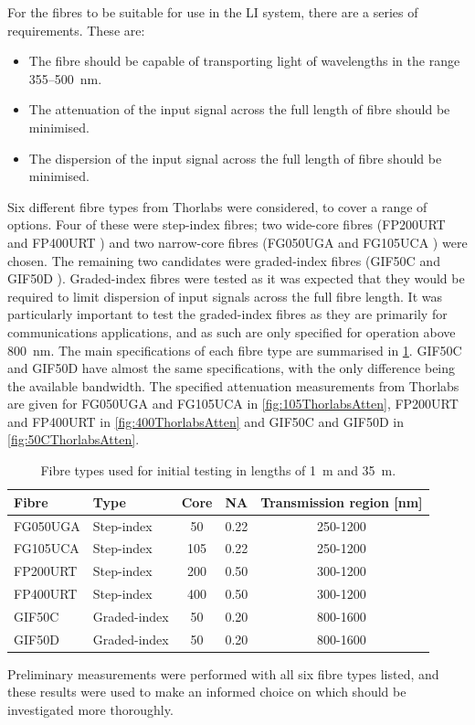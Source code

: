 \documentclass[a4paper,11pt]{article}
\begin{document}
For the fibres to be suitable for use in the LI system, there are a series of requirements. These are:
\begin{itemize}
\item The fibre should be capable of transporting light of wavelengths in the range 355--500~nm.
\item The attenuation of the input signal across the full length of fibre should be minimised.
\item The dispersion of the input signal across the full length of fibre should be minimised.
\end{itemize}

Six different fibre types from Thorlabs were considered, to cover a range of options. Four of these were step-index fibres; two wide-core fibres (FP200URT \cite{bib:fp200urt} and FP400URT \cite{bib:fp400urt}) and two narrow-core fibres (FG050UGA \cite{bib:fg050uga} and FG105UCA \cite{bib:fg105uca}) were chosen. The remaining two candidates were graded-index fibres (GIF50C \cite{bib:gif50c} and GIF50D \cite{bib:gif50d}). Graded-index fibres were tested as it was expected that they would be required to limit dispersion of input signals across the full fibre length. It was particularly important to test the graded-index fibres as they are primarily for communications applications, and as such are only specified for operation above 800~nm. The main specifications of each fibre type are summarised in \cref{tab:fibres}. GIF50C and GIF50D have almost the same specifications, with the only difference being the available bandwidth. The specified attenuation measurements from Thorlabs are given for FG050UGA and FG105UCA in \cref{fig:105ThorlabsAtten}, FP200URT and FP400URT in \cref{fig:400ThorlabsAtten} and GIF50C and GIF50D in \cref{fig:50CThorlabsAtten}.
\begin{table}[h]
\centering
\begin{tabular}{llccc}
\toprule
Fibre	   & Type   		  & Core \diameter [$\mu$m] &  NA 	  &  Transmission region [nm]\\ \midrule
FG050UGA   &  Step-index      &           \phantom{0}50  			&  0.22   &   250-1200       \\
FG105UCA   &  Step-index      &           105  			&  0.22   &   250-1200       \\
FP200URT   &  Step-index      &           200  			&  0.50   &   300-1200       \\
FP400URT   &  Step-index      &           400  			&  0.50   &   300-1200      \\
GIF50C     &  Graded-index    &           \phantom{0}50  			&  0.20	  &   800-1600       \\
GIF50D     &  Graded-index    &           \phantom{0}50 			&  0.20   &   800-1600      \\ \bottomrule
\end{tabular}
\caption{Fibre types used for initial testing in lengths of 1~m and 35~m.}\label{tab:fibres}
\end{table}
Preliminary measurements were performed with all six fibre types listed, and these results were used to make an informed choice on which should be investigated more thoroughly.
\end{document}
